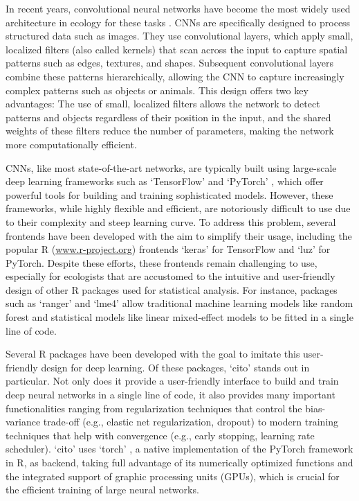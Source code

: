 \documentclass[12pt,twoside]{scrreport}
\newcommand{\pkg}[1]{`#1'}
\begin{document}
In recent years, convolutional neural networks \citep[CNNs,][]{lecunBackpropagationAppliedHandwritten1989a} have become the most widely used architecture in ecology for these tasks \citep{christinApplicationsDeepLearning2019}. CNNs are specifically designed to process structured data such as images. They use convolutional layers, which apply small, localized filters (also called kernels) that scan across the input to capture spatial patterns such as edges, textures, and shapes. Subsequent convolutional layers combine these patterns hierarchically, allowing the CNN to capture increasingly complex patterns such as objects or animals. This design offers two key advantages: The use of small, localized filters allows the network to detect patterns and objects regardless of their position in the input, and the shared weights of these filters reduce the number of parameters, making the network more computationally efficient.\newpage

CNNs, like most state-of-the-art networks, are typically built using large-scale deep learning frameworks such as \pkg{TensorFlow} \citep{abadiTensorFlowSystemLargeScale2016} and \pkg{PyTorch} \citep{paszkePyTorchImperativeStyle2019}, which offer powerful tools for building and training sophisticated models. However, these frameworks, while highly flexible and efficient, are notoriously difficult to use due to their complexity and steep learning curve. To address this problem, several frontends have been developed with the aim to simplify their usage, including the popular R (\url{www.r-project.org}) frontends \pkg{keras} \citep{chollet2015keras} for TensorFlow and \pkg{luz} \citep{falbelLuzHigherLevel2024} for PyTorch. Despite these efforts, these frontends remain challenging to use, especially for ecologists that are accustomed to the intuitive and user-friendly design of other R packages used for statistical analysis. For instance, packages such as \pkg{ranger} \citep{wrightRangerFastImplementation2017} and \pkg{lme4} \citep{batesFittingLinearMixedeffects2015} allow traditional machine learning models like random forest and statistical models like linear mixed-effect models to be fitted in a single line of code.

Several R packages have been developed with the goal to imitate this user-friendly design for deep learning. Of these packages, \pkg{cito} \citep{amesoderCitoPackageTraining2024} stands out in particular. Not only does it provide a user-friendly interface to build and train deep neural networks in a single line of code, it also provides many important functionalities ranging from regularization techniques that control the bias-variance trade-off (e.g., elastic net regularization, dropout) to modern training techniques that help with convergence (e.g., early stopping, learning rate scheduler). \pkg{cito} uses \pkg{torch} \citep{falbelTorchTensorsNeural2024}, a native implementation of the PyTorch framework in R, as backend, taking full advantage of its numerically optimized functions and the integrated support of graphic processing units (GPUs), which is crucial for the efficient training of large neural networks.
\end{document}
